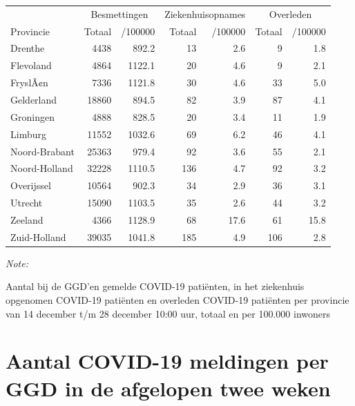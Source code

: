 \documentclass[
  english,
  man,floatsintext]{apa6}
\begin{document}
\begin{table}
\centering
\begin{threeparttable}
\begin{tabular}{lrrrrrr}
\toprule
\multicolumn{1}{c}{ } & \multicolumn{2}{c}{Besmettingen} & \multicolumn{2}{c}{Ziekenhuisopnames} & \multicolumn{2}{c}{Overleden} \\
\cmidrule(l{3pt}r{3pt}){2-3} \cmidrule(l{3pt}r{3pt}){4-5} \cmidrule(l{3pt}r{3pt}){6-7}
Provincie & Totaal & /100000 & Totaal & /100000 & Totaal & /100000\\
\midrule
Drenthe & 4438 & 892.2 & 13 & 2.6 & 9 & 1.8\\
Flevoland & 4864 & 1122.1 & 20 & 4.6 & 9 & 2.1\\
FryslÃ¢n & 7336 & 1121.8 & 30 & 4.6 & 33 & 5.0\\
Gelderland & 18860 & 894.5 & 82 & 3.9 & 87 & 4.1\\
Groningen & 4888 & 828.5 & 20 & 3.4 & 11 & 1.9\\
Limburg & 11552 & 1032.6 & 69 & 6.2 & 46 & 4.1\\
Noord-Brabant & 25363 & 979.4 & 92 & 3.6 & 55 & 2.1\\
Noord-Holland & 32228 & 1110.5 & 136 & 4.7 & 92 & 3.2\\
Overijssel & 10564 & 902.3 & 34 & 2.9 & 36 & 3.1\\
Utrecht & 15090 & 1103.5 & 35 & 2.6 & 44 & 3.2\\
Zeeland & 4366 & 1128.9 & 68 & 17.6 & 61 & 15.8\\
Zuid-Holland & 39035 & 1041.8 & 185 & 4.9 & 106 & 2.8\\
\bottomrule
\end{tabular}
\begin{tablenotes}
\item \textit{Note: } 
\item Aantal bij de GGD’en gemelde COVID-19 patiënten, in het ziekenhuis opgenomen COVID-19 patiënten en overleden COVID-19 patiënten per provincie van 14 december t/m 28 december 10:00 uur, totaal en per 100.000 inwoners
\end{tablenotes}
\end{threeparttable}
\end{table}

\newpage

\hypertarget{aantal-covid-19-meldingen-per-ggd-in-de-afgelopen-twee-weken}{%
\section{Aantal COVID-19 meldingen per GGD in de afgelopen twee weken}\label{aantal-covid-19-meldingen-per-ggd-in-de-afgelopen-twee-weken}}
\end{document}
